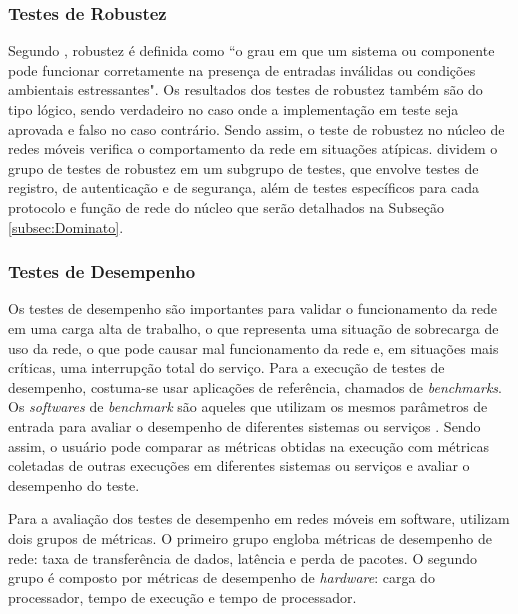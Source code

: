 \subsubsection{Testes de Robustez}

Segundo \cite[p.~64, tradução nossa]{IEEE.Standard.Glossary}, robustez é definida como ``o grau em que um sistema ou componente pode funcionar corretamente na presença de entradas inválidas ou condições ambientais estressantes".
Os resultados dos testes de robustez também são do tipo lógico, sendo verdadeiro no caso onde a implementação em teste seja aprovada e falso no caso contrário.
Sendo assim, o teste de robustez no núcleo de redes móveis verifica o comportamento da rede em situações atípicas. \cite{Dominato2021} dividem o grupo de testes de robustez em um subgrupo de testes, que envolve testes de registro, de autenticação e de segurança, além de testes específicos para cada protocolo e função de rede do núcleo que serão detalhados na Subseção \ref{subsec:Dominato}.

\subsubsection{Testes de Desempenho}

Os testes de desempenho são importantes para validar o funcionamento da rede em uma carga alta de trabalho, o que representa uma situação de sobrecarga de uso da rede, o que pode causar mal funcionamento da rede e, em situações mais críticas, uma interrupção total do serviço.
Para a execução de testes de desempenho, costuma-se usar aplicações de referência, chamados de \textit{benchmarks}.
Os \textit{softwares} de \textit{benchmark} são aqueles que utilizam os mesmos parâmetros de entrada para avaliar o desempenho de diferentes sistemas ou serviços \cite{Boano2018}.
Sendo assim, o usuário pode comparar as métricas obtidas na execução com métricas coletadas de outras execuções em diferentes sistemas ou serviços e avaliar o desempenho do teste.

Para a avaliação dos testes de desempenho em redes móveis em software, \cite{Lee2021} utilizam dois grupos de métricas.
O primeiro grupo engloba métricas de desempenho de rede: taxa de transferência de dados, latência e perda de pacotes.
O segundo grupo é composto por métricas de desempenho de \textit{hardware}: carga do processador, tempo de execução e tempo de processador.

